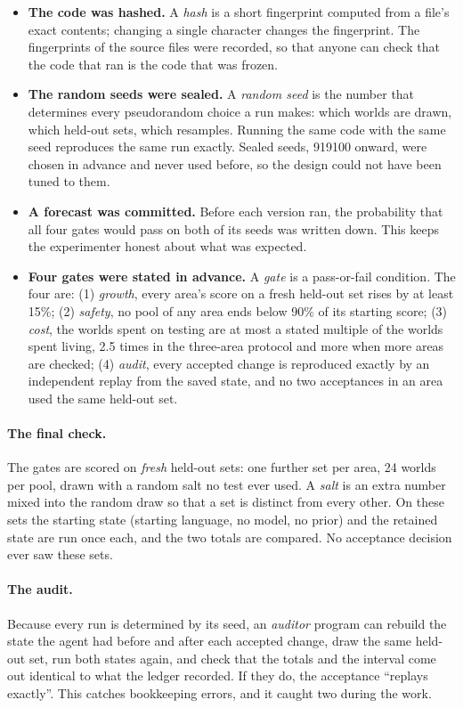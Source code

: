 \documentclass[11pt]{article}
\begin{document}
\begin{itemize}[leftmargin=*]
\item \textbf{The code was hashed.} A \emph{hash} is a short fingerprint computed from a file's exact contents; changing a single character changes the fingerprint. The fingerprints of the source files were recorded, so that anyone can check that the code that ran is the code that was frozen.
\item \textbf{The random seeds were sealed.} A \emph{random seed} is the number that determines every pseudorandom choice a run makes: which worlds are drawn, which held-out sets, which resamples. Running the same code with the same seed reproduces the same run exactly. Sealed seeds, 919100 onward, were chosen in advance and never used before, so the design could not have been tuned to them.
\item \textbf{A forecast was committed.} Before each version ran, the probability that all four gates would pass on both of its seeds was written down. This keeps the experimenter honest about what was expected.
\item \textbf{Four gates were stated in advance.} A \emph{gate} is a pass-or-fail condition. The four are: (1) \emph{growth}, every area's score on a fresh held-out set rises by at least 15\%; (2) \emph{safety}, no pool of any area ends below 90\% of its starting score; (3) \emph{cost}, the worlds spent on testing are at most a stated multiple of the worlds spent living, 2.5 times in the three-area protocol and more when more areas are checked; (4) \emph{audit}, every accepted change is reproduced exactly by an independent replay from the saved state, and no two acceptances in an area used the same held-out set.
\end{itemize}

\paragraph{The final check.} The gates are scored on \emph{fresh} held-out sets: one further set per area, 24 worlds per pool, drawn with a random salt no test ever used. A \emph{salt} is an extra number mixed into the random draw so that a set is distinct from every other. On these sets the starting state (starting language, no model, no prior) and the retained state are run once each, and the two totals are compared. No acceptance decision ever saw these sets.

\paragraph{The audit.} Because every run is determined by its seed, an \emph{auditor} program can rebuild the state the agent had before and after each accepted change, draw the same held-out set, run both states again, and check that the totals and the interval come out identical to what the ledger recorded. If they do, the acceptance ``replays exactly''. This catches bookkeeping errors, and it caught two during the work.
\end{document}
